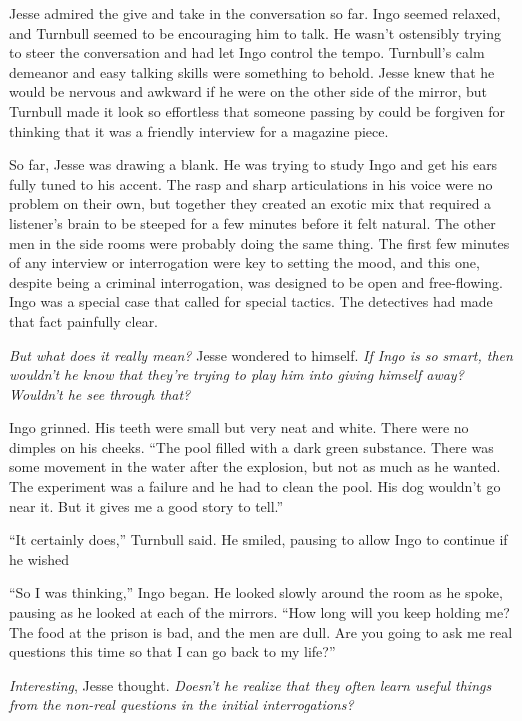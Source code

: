 \documentclass[12pt]{book}
\begin{document}
Jesse admired the give and take in the conversation so far.  Ingo seemed relaxed, and Turnbull seemed to be encouraging him to talk.  He wasn't ostensibly trying to steer the conversation and had let Ingo control the tempo.  Turnbull's calm demeanor and easy talking skills were something to behold.  Jesse knew that he would be nervous and awkward if he were on the other side of the mirror, but Turnbull made it look so effortless that someone passing by could be forgiven for thinking that it was a friendly interview for a magazine piece.

So far, Jesse was drawing a blank.  He was trying to study Ingo and get his ears fully tuned to his accent.  The rasp and sharp articulations in his voice were no problem on their own, but together they created an exotic mix that required a listener's brain to be steeped for a few minutes before it felt natural.  The other men in the side rooms were probably doing the same thing.  The first few minutes of any interview or interrogation were key to setting the mood, and this one, despite being a criminal interrogation, was designed to be open and free-flowing.  Ingo was a special case that called for special tactics.  The detectives had made that fact painfully clear.

\emph{But what does it really mean?} Jesse wondered to himself.  \emph{If Ingo is so smart, then wouldn't he know that they're trying to play him into giving himself away?  Wouldn't he see through that?}

Ingo grinned.  His teeth were small but very neat and white.  There were no dimples on his cheeks.  ``The pool filled with a dark green substance.  There was some movement in the water after the explosion, but not as much as he wanted.  The experiment was a failure and he had to clean the pool.  His dog wouldn't go near it.  But it gives me a good story to tell.''

``It certainly does,'' Turnbull said.  He smiled, pausing to allow Ingo to continue if he wished

``So I was thinking,'' Ingo began.  He looked slowly around the room as he spoke, pausing as he looked at each of the mirrors.  ``How long will you keep holding me?  The food at the prison is bad, and the men are dull.  Are you going to ask me real questions this time so that I can go back to my life?''

\emph{Interesting}, Jesse thought.  \emph{Doesn't he realize that they often learn useful things from the non-real questions in the initial interrogations?}
\end{document}
